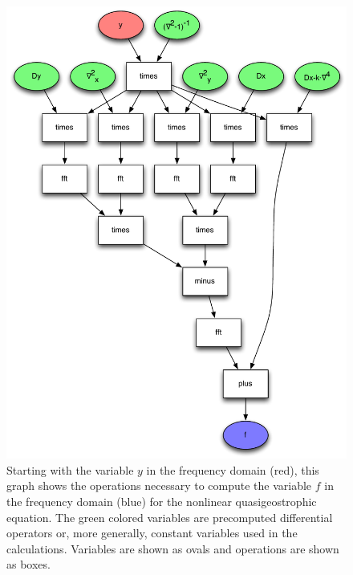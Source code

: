 \documentclass[11pt]{article}
\begin{document}
\begin{figure}
\begin{center}
\includegraphics[width=4.8in]{QGfFromY}
\caption{Starting with the variable $y$ in the frequency domain (red), this graph shows the operations necessary to compute the variable $f$ in the frequency domain (blue) for the nonlinear quasigeostrophic equation. The green colored variables are precomputed differential operators or, more generally, constant variables used in the calculations. Variables are shown as ovals and operations are shown as boxes.}
\label{QGfFromY}
\end{center}
\end{figure}
\end{document}
